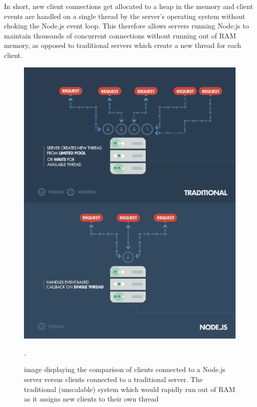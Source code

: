 \documentclass[bsc,frontabs,twoside,singlespacing,parskip,deptreport]{infthesis}     %
\begin{document}
In short, new client connections get allocated to a heap in the memory and client events are handled on a single thread by the server's operating system without choking the Node.js event loop. This therefore allows servers running Node.js to maintain thousands of concurrent connections without running out of RAM memory\cite{Node_Stress_Test}, as opposed to traditional servers which create a new thread for each client.

\begin{center}
\begin{figure}
\centering
\label{fig:nodejs_server_client}
\includegraphics[scale=0.5]{images/nodejs_img.png}
\caption{image displaying the comparison of clients connected to a Node.js server versus clients connected to a traditional server. The traditional (unscalable) system which would rapidly run out of RAM as it assigns new clients to their own thread\cite{NodeJS_Image}}.
\end{figure}
\end{center}
\end{document}
